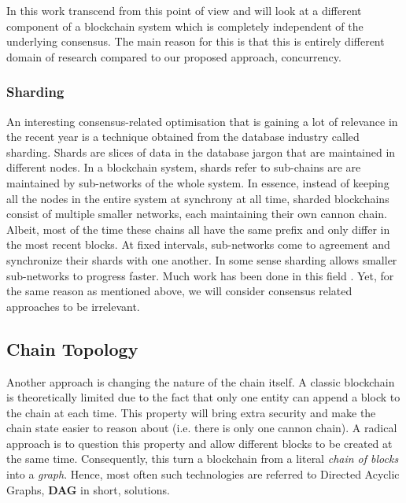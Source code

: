 In this work transcend from this point of view and will look at a different component of a
blockchain system which is completely independent of the underlying consensus. The main reason for
this is that this is entirely different domain of research compared to our proposed approach,
concurrency.

\subsubsection{Sharding}

An interesting consensus-related optimisation that is gaining a lot of relevance in the recent year
is a technique obtained from the database industry called sharding. Shards are slices of data in the
database jargon that are maintained in different nodes. In a blockchain system, shards refer to
sub-chains are are maintained by sub-networks of the whole system. In essence, instead of keeping
all the nodes in the entire system at synchrony at all time, sharded blockchains consist of multiple
smaller networks, each maintaining their own cannon chain. Albeit, most of the time these chains all
have the same prefix and only differ in the most recent blocks. At fixed intervals, sub-networks
come to agreement and synchronize their shards with one another. In some sense sharding allows
smaller sub-networks to progress faster. Much work has been done in this field
\cite{Forestier_Vodenicarevic_Laversanne_Finot_2019_block_qlique,
Al_Bassam_Sonnino_Bano_Hrycyszyn_Danezis_2017_chainspace,
Shrey_Singh_Sathya_Yogesh_2019_diep_trans}. Yet, for the same reason as mentioned above, we will
consider consensus related approaches to be irrelevant.

\subsection{Chain Topology}

Another approach is changing the nature of the chain itself. A classic blockchain is
theoretically limited due to the fact that only one entity can append a block to the chain at each time.
This property will bring extra security and make the chain state easier to reason about (i.e. there
is only one cannon chain). A radical approach is to question this property and allow different
blocks to be created at the same time. Consequently, this turn a blockchain from a literal
\textit{chain of blocks} into a \textit{graph}. Hence, most often such technologies are
referred to Directed Acyclic Graphs, \textbf{DAG} in short, solutions.

